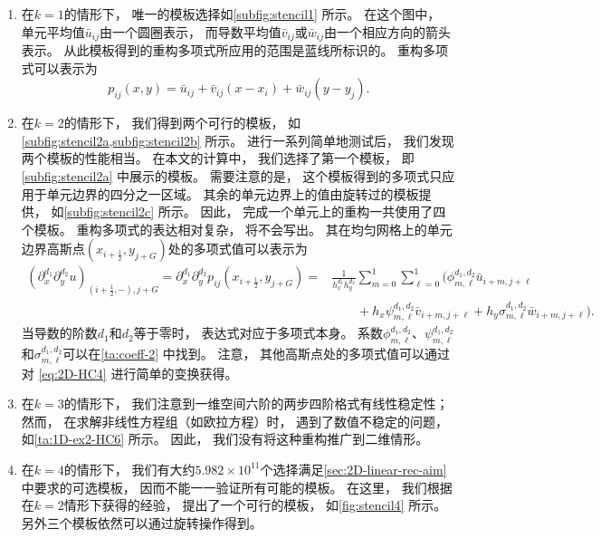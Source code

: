\begin{enumerate}
  \item 在$k=1$的情形下，
        唯一的模板选择如\cref{subfig:stencil1} 所示。
        在这个图中，
        单元平均值$\bar u_{ij}$由一个圆圈表示，
        而导数平均值$\bar v_{ij}$或$\bar w_{ij}$由一个相应方向的箭头表示。
        从此模板得到的重构多项式所应用的范围是蓝线所标识的。
        重构多项式可以表示为
        \begin{equation}
          \label{eq:2D-HC2}
          p_{ij}(x,y) = \bar u_{ij} + \bar v_{ij} (x-x_i) + \bar w_{ij} (y-y_j).
        \end{equation}
  \item 在$k=2$的情形下，
        我们得到两个可行的模板，
        如\cref{subfig:stencil2a,subfig:stencil2b} 所示。
        进行一系列简单地测试后，
        我们发现两个模板的性能相当。
        在本文的计算中，
        我们选择了第一个模板，
        即\cref{subfig:stencil2a} 中展示的模板。
        需要注意的是，
        这个模板得到的多项式只应用于单元边界的四分之一区域。
        其余的单元边界上的值由旋转过的模板提供，
        如\cref{subfig:stencil2c} 所示。
        因此，
        完成一个单元上的重构一共使用了四个模板。
        重构多项式的表达相对复杂，
        将不会写出。
        其在均匀网格上的单元边界高斯点$(x_{i+\frac{1}{2}},y_{j+G})$处的多项式值可以表示为
        \begin{equation}
          \label{eq:2D-HC4}
          \begin{aligned}
            \left({\partial_{x}^{d_1}}{\partial_{y}^{d_2}} u\right)_{(i+\frac 12,-),j+G} = {\partial_{x}^{d_1}}{\partial_{y}^{d_2}} p_{ij}(x_{i+\frac 12}, y_{j+G})=
             & \frac{1}{h_x^{d_1} h_y^{d_2}} \sum_{m=0}^{1}\sum_{\ell=0}^{1} \big(\phi_{m, \ell}^{d_1, d_2} \bar u_{i+m, j+\ell}             \\
             & \quad\quad + h_x \psi_{m, \ell}^{d_1, d_2} \bar v_{i+m, j+\ell} + h_y \sigma_{m, \ell}^{d_1, d_2} \bar w_{i+m, j+\ell}\big).
          \end{aligned}
        \end{equation}
        当导数的阶数$d_1$和$d_2$等于零时，
        表达式对应于多项式本身。
        系数$\phi_{m, \ell}^{d_1, d_2}$、$\psi_{m, \ell}^{d_1, d_2}$和$\sigma_{m, \ell}^{d_1, d_2}$可以在\cref{ta:coeff-2} 中找到。
        注意，
        其他高斯点处的多项式值可以通过对 \cref{eq:2D-HC4} 进行简单的变换获得。
  \item 在$k=3$的情形下，
        我们注意到一维空间六阶的两步四阶格式有线性稳定性；然而，
        在求解非线性方程组（如欧拉方程）时，
        遇到了数值不稳定的问题，
        如\cref{ta:1D-ex2-HC6} 所示。
        因此，
        我们没有将这种重构推广到二维情形。
  \item 在$k=4$的情形下，
        我们有大约$5.982 \times 10^{11}$个选择满足\cref{sec:2D-linear-rec-aim}中要求的可选模板，
        因而不能一一验证所有可能的模板。
        在这里，
        我们根据在$k=2$情形下获得的经验，
        提出了一个可行的模板，
        如\cref{fig:stencil4} 所示。
        另外三个模板依然可以通过旋转操作得到。
\end{enumerate}


